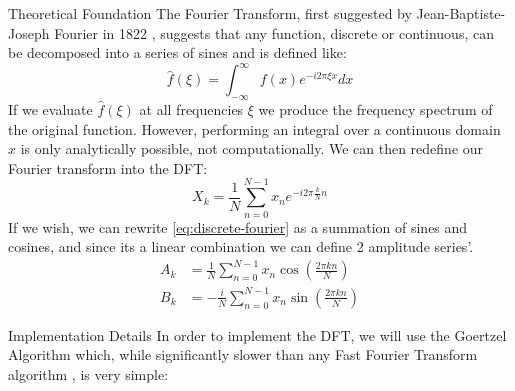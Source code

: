 \documentclass[reqno]{amsart}
\makeatletter
\renewcommand\subsection{\@startsection{subsection}{2}%
  \z@{.5\linespacing\@plus.7\linespacing}{-.5em}%
  {\normalfont\scshape\justify}}
\numberwithin{equation}{section}
\numberwithin{figure}{section}
\makeatother
\begin{document}
\subsection{Theoretical Foundation}
The Fourier Transform, first suggested by Jean-Baptiste-Joseph Fourier in 1822 \cite{Fourier1822}, suggests that any function, discrete or continuous, can be decomposed into a series of sines and is defined like:
\begin{equation}
    \hat{f}(\xi) = \int_{-\infty}^{\infty} f(x) e^{-i2\pi\xi x} dx
    \label{eq:continuous-fourier}
\end{equation}
If we evaluate $\hat{f}(\xi)$ at all frequencies $\xi$ we produce the frequency spectrum of the original function. However, performing an integral over a continuous domain $x$ is only analytically possible, not computationally. We can then redefine our Fourier transform into the DFT:
\begin{equation}
    X_k = \frac{1}{N}\sum_{n=0}^{N-1} x_n e^{-i2\pi \frac{k}{N} n}
    \label{eq:discrete-fourier}
\end{equation}
If we wish, we can rewrite \ref{eq:discrete-fourier} as a summation of sines and cosines, and since its a linear combination we can define 2 amplitude series'.
\begin{equation}
    \begin{aligned}
        A_k &= \frac{1}{N}\sum_{n=0}^{N-1} x_n \cos\left(\frac{2\pi k n}{N}\right) \\
        B_k &=  - \frac{i}{N}\sum_{n=0}^{N-1} x_n \sin\left(\frac{2\pi k n}{N}\right)
    \end{aligned}
    \label{eq:discrete-fourier-sines-cosines}
\end{equation}

\subsection{Implementation Details}
In order to implement the DFT, we will use the Goertzel Algorithm \cite{Goertzel1958} which, while significantly slower than any Fast Fourier Transform algorithm \cite{Cooley1965}, is very simple: \\
\end{document}
